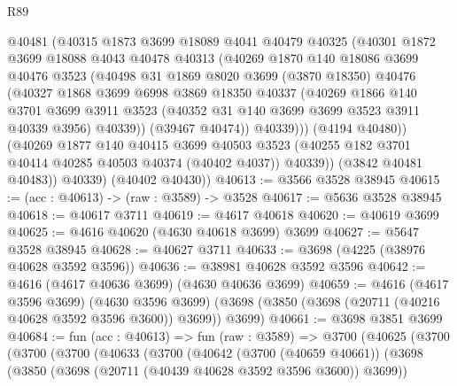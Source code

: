 \begin{lexlean}{R89}
\begin{coremodule}
              @40481
              (@40315
                @1873
                @3699
                @18089
                @4041
                @40479
                @40325
                (@40301
                  @1872
                  @3699
                  @18088
                  @4043
                  @40478
                  @40313
                  (@40269
                    @1870
                    @140
                    @18086
                    @3699
                    @40476
                    @3523
                    (@40498
                      @31
                      @1869
                      @8020
                      @3699
                      (@3870 @18350)
                      @40476
                      (@40327
                        @1868
                        @3699
                        @6998
                        @3869
                        @18350
                        @40337
                        (@40269
                          @1866
                          @140
                          @3701
                          @3699
                          @3911
                          @3523
                          (@40352 @31 @140 @3699 @3699 @3523 @3911 @40339 @3956)
                          @40339))
                      (@39467 @40474))
                    @40339)))
              (@4194 @40480))
            (@40269
              @1877
              @140
              @40415
              @3699
              @40503
              @3523
              (@40255 @182 @3701 @40414 @40285 @40503 @40374 (@40402 @4037))
              @40339))
          (@3842 @40481 @40483))
        @40339)
      (@40402 @40430))
@40613 := @3566 @3528 @38945
@40615 := (acc : @40613) -> (raw : @3589) -> @3528
@40617 := @5636 @3528 @38945
@40618 := @40617 @3711
@40619 := @4617 @40618
@40620 := @40619 @3699
@40625 := @4616 @40620 (@4630 @40618 @3699) @3699
@40627 := @5647 @3528 @38945
@40628 := @40627 @3711
@40633 := @3698 (@4225 (@38976 @40628 @3592 @3596))
@40636 := @38981 @40628 @3592 @3596
@40642 := @4616 (@4617 @40636 @3699) (@4630 @40636 @3699)
@40659 := @4616
    (@4617 @3596 @3699)
    (@4630 @3596 @3699)
    (@3698 (@3850 (@3698 (@20711 (@40216 @40628 @3592 @3596 @3600)) @3699)) @3699)
@40661 := @3698 @3851 @3699
@40684 := fun (acc : @40613) =>
  fun (raw : @3589) =>
  @3700
    (@40625
      (@3700
        (@3700
          (@3700
            (@40633
              (@3700
                (@40642
                  (@3700 (@40659 @40661))
                  (@3698
                    (@3850 (@3698 (@20711 (@40439 @40628 @3592 @3596 @3600)) @3699))

\end{coremodule}
\end{lexlean}
